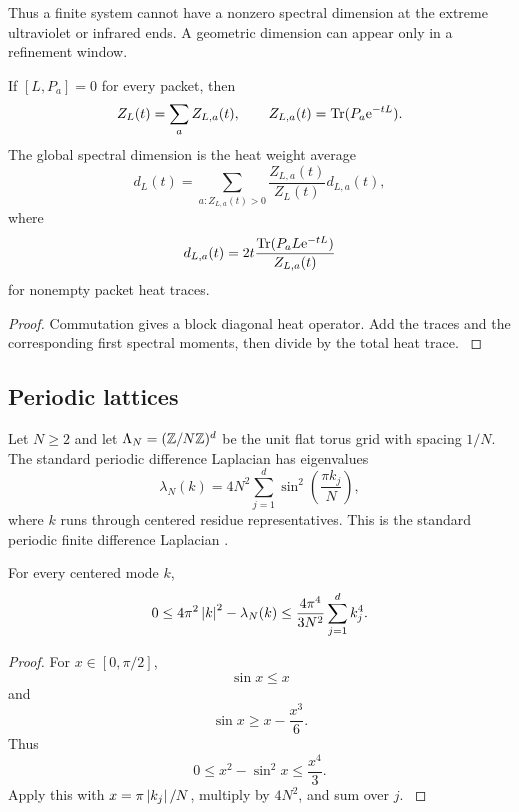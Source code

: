 Thus a finite system cannot have a nonzero spectral dimension at the extreme ultraviolet or infrared ends. A geometric dimension can appear only in a refinement window.

\begin{proposition}\label{strong:proposition:010}\label{strong:prop:heat_packets}
If \([L,P_a]=0\) for every packet, then
\[
Z_L(t)=\sum_aZ_{L,a}(t),
\qquad
Z_{L,a}(t)=\Tr(P_a\e^{-tL}).
\]
The global spectral dimension is the heat weight average
\[
d_L(t)
=
\sum_{a:Z_{L,a}(t)>0}
\frac{Z_{L,a}(t)}{Z_L(t)}
 d_{L,a}(t),
\]
where
\[
d_{L,a}(t)
=2t
\frac{\Tr(P_aL\e^{-tL})}{Z_{L,a}(t)}
\]
for nonempty packet heat traces.
\end{proposition}

\begin{proof}\label{strong:proof:063}
Commutation gives a block diagonal heat operator. Add the traces and the corresponding first spectral moments, then divide by the total heat trace.
\label{strong:proof:063:end}\end{proof}

\subsection{Periodic lattices}\label{strong:subsec:periodic_lattices}

Let \(N\geq2\) and let \(\Lambda_N=(\ZZ/N\ZZ)^d\) be the unit flat torus grid with spacing \(1/N\). The standard periodic difference Laplacian has eigenvalues
\[
\lambda_N(k)
=
4N^2
\sum_{j=1}^{d}
\sin^2\left(\frac{\pi k_j}{N}\right),
\]
where \(k\) runs through centered residue representatives. This is the standard periodic finite difference Laplacian \cite{Strikwerda2004}.

\begin{theorem}\label{strong:theorem:039}\label{strong:thm:dispersion_bound}
For every centered mode \(k\),
\[
0
\leq
4\pi^2\left\lvert k\right\rvert^2-\lambda_N(k)
\leq
\frac{4\pi^4}{3N^2}
\sum_{j=1}^{d}k_j^4.
\]
\end{theorem}

\begin{proof}\label{strong:proof:064}
For \(x\in[0,\pi/2]\),
\[
\sin x\leq x
\]
and
\[
\sin x\geq x-\frac{x^3}{6}.
\]
Thus
\[
0\leq x^2-\sin^2x\leq\frac{x^4}{3}.
\]
Apply this with \(x=\pi\left\lvert k_j\right\rvert/N\), multiply by \(4N^2\), and sum over \(j\).
\label{strong:proof:064:end}\end{proof}


